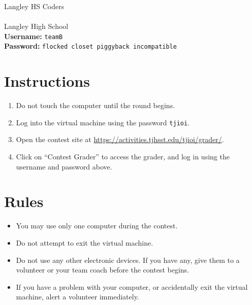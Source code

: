 \documentclass[12pt]{article}
\begin{document}
{\Huge Langley HS Coders}\\\\
{\Large Langley High School}\\

\textbf{Username:} \verb|teamB|\\
\textbf{Password:} \verb|flocked closet piggyback incompatible|

\section*{Instructions}

\begin{enumerate}
    \item Do not touch the computer until the round begins.
    \item Log into the virtual machine using the password \verb|tjioi|.
    \item Open the contest site at \url{https://activities.tjhsst.edu/tjioi/grader/}.
    \item Click on ``Contest Grader'' to access the grader, and log in using the username and password above.
\end{enumerate}

\section*{Rules}

\begin{itemize}
    \item You may use only one computer during the contest.
    \item Do not attempt to exit the virtual machine.
    \item Do not use any other electronic devices. If you have any, give them to a volunteer or your team coach before the contest begins.
    \item If you have a problem with your computer, or accidentally exit the virtual machine, alert a volunteer immediately.
\end{itemize}
\end{document}
